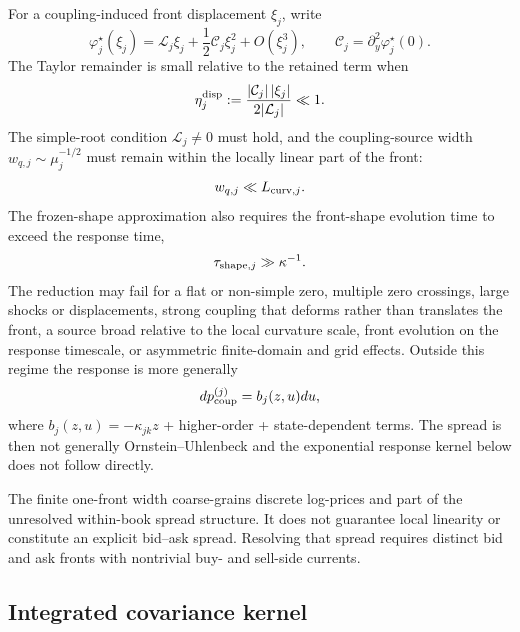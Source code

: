 \documentclass[5p,final]{elsarticle}
\begin{document}
For a coupling-induced front displacement $\xi_j$, write
\begin{equation}
    \varphi_j^\star(\xi_j)
    =\mathcal L_j\xi_j
    +\frac12\mathcal C_j\xi_j^2
    +O(\xi_j^3),
    \qquad
    \mathcal C_j=\partial_y^2\varphi_j^\star(0).
\end{equation}
The Taylor remainder is small relative to the retained term when
\begin{equation}
    \eta_j^{\rm disp}
    :=\frac{|\mathcal C_j|\,|\xi_j|}{2|\mathcal L_j|}
    \ll1.
\end{equation}
The simple-root condition $\mathcal L_j\neq0$ must hold, and the coupling-source width $w_{q,j}\sim\mu_j^{-1/2}$ must remain within the locally linear part of the front:
\begin{equation}
    w_{q,j}\ll L_{{\rm curv},j}.
\end{equation}
The frozen-shape approximation also requires the front-shape evolution time to exceed the response time,
\begin{equation}
    \tau_{{\rm shape},j}\gg\kappa^{-1}.
\end{equation}
The reduction may fail for a flat or non-simple zero, multiple zero crossings, large shocks or displacements, strong coupling that deforms rather than translates the front, a source broad relative to the local curvature scale, front evolution on the response timescale, or asymmetric finite-domain and grid effects. Outside this regime the response is more generally
\begin{equation}
    dp_{\rm coup}^{(j)}=b_j(z,u)du,
\end{equation}   
where $b_j(z,u)=-\kappa_{jk}z$ + higher-order + state-dependent terms. The spread is then not generally Ornstein--Uhlenbeck and the exponential response kernel below does not follow directly.

The finite one-front width coarse-grains discrete log-prices and part of the unresolved within-book spread structure. It does not guarantee local linearity or constitute an explicit bid--ask spread. Resolving that spread requires distinct bid and ask fronts with nontrivial buy- and sell-side currents.

\subsection{Integrated covariance kernel}
\end{document}
